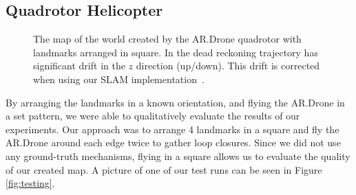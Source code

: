 \documentclass[conference]{IEEEtran}
\begin{document}
\subsection{Quadrotor Helicopter}
\label{sub:results}

\begin{figure}[t]
  \begin{center}
    \caption{The map of the world created by the AR.Drone quadrotor with landmarks
      arranged in square.  In  the dead reckoning trajectory has
      significant drift in the $z$ direction (up/down).  This drift is corrected when
      using our \ac{SLAM} implementation~.}
    \label{fig:mapadjustment}
  \end{center}
\end{figure}

By arranging the landmarks in a known orientation, and flying the AR.Drone in a set
pattern, we were able to qualitatively evaluate the results of our experiments. Our
approach was to arrange 4 landmarks in a square and fly the AR.Drone around each edge
twice to gather loop closures. Since we did not use any ground-truth mechanisms, flying in
a square allows us to evaluate the quality of our created map. A picture of one of our
test runs can be seen in Figure \ref{fig:testing}.
\end{document}
